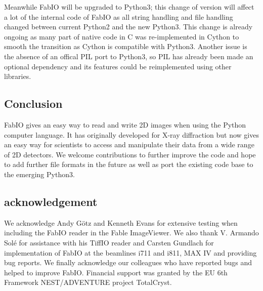 \documentclass{iucr}
\begin{document}
Meanwhile FabIO will be upgraded to Python3; this change of version will affect
a lot of the internal code of FabIO as all string handling and file handling
changed between current Python2 and the new Python3. This change is already
ongoing as many part of native code in C was re-implemented in
Cython \cite{cython} to smooth the transition as Cython is compatible with
Python3. Another issue is the absence of an offical PIL port to Python3, so PIL
has already been made an optional dependency and its features could be
reimplemented using other libraries. 

\subsection{Conclusion}

FabIO gives an easy way to read and write 2D images when using the
Python computer language.
It has originally developed for X-ray diffraction but now gives
an easy way for scientists to access and manipulate
their data from a wide range of 2D detectors.
We welcome contributions to further improve the code and hope to add
further file formats in the future as well as port the existing code base 
to the emerging Python3.


\subsection{acknowledgement}
We acknowledge Andy G\"otz and Kenneth Evans for extensive testing when including
the FabIO reader in the Fable ImageViewer.
We also thank V. Armando Sol\'e for assistance with his TiffIO reader and
Carsten Gundlach for implementation of FabIO at the beamlines i711 and i811, MAX IV and providing bug reports.
We finally acknowledge our colleagues who have reported bugs and helped to
improve FabIO.
Financial support was granted by the EU 6th Framework NEST/ADVENTURE project
TotalCryst.





\appendix
\end{document}
